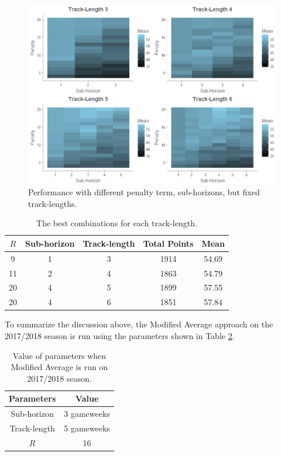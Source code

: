 \begin{figure}[H]
    \centering
    \includegraphics[scale=0.55]{fig/chapter_6/paramter_choice_fixed_f_hor.png}
    \caption{Performance with different penalty term, sub-horizons, but fixed track-lengths.}
\label{fig:fixed_f_hor}    
\end{figure}

\begin{table}[H]
\centering
\begin{tabular}{|c|c|c|c|c|}
\hline
$R$ & Sub-horizon & Track-length & Total Points & Mean  \\
\hline
9       & 1       & 3                & 1914         & 54.69 \\
11      & 2       & 4                & 1863         & 54.79 \\
20      & 4       & 5                & 1899         & 57.55 \\
20      & 4       & 6                & 1851         & 57.84 \\
\hline
\end{tabular}
\caption{The best combinations for each track-length.}
\label{tab:top_5}
\end{table}


\newpar
To summarize the discussion above, the Modified Average approach on the 2017/2018 season is run using the parameters shown in Table \ref{tab:final_parameters_ma}.

\begin{table}[H]
\centering
\begin{tabular}{|c|c|}
    \hline
    Parameters      &  Value \\
    \hline
    Sub-horizon     &   3 gameweeks \\
    Track-length    &   5 gameweeks \\ 
    $R$             &   16 \\ 
    \hline
\end{tabular}
\caption{Value of parameters when Modified Average is run on 2017/2018 season.}
\label{tab:final_parameters_ma}
\end{table}

